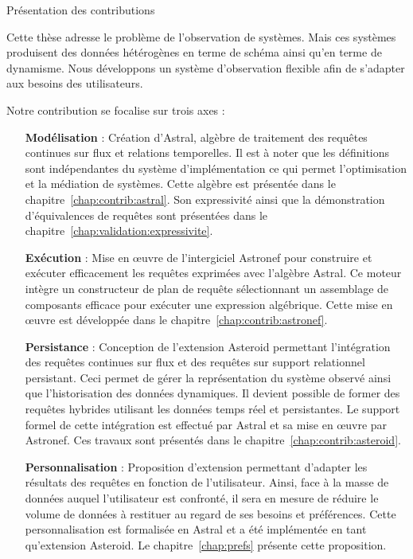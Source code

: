 \newpage
{}%
\quad

\vspace{2.3\baselineskip}
\begin{flushright} \huge Présentation des contributions \end{flushright}
\vspace{1.7\baselineskip}

Cette thèse adresse le problème de l'observation de systèmes. Mais ces systèmes produisent des données hétérogènes en terme de schéma ainsi qu'en terme de dynamisme. Nous développons un système d'observation flexible afin de s'adapter aux besoins des utilisateurs.

Notre contribution se focalise sur trois axes :
\begin{itemize}
 \item[\textbf{Modélisation}] : Création d'Astral, algèbre de traitement des requêtes continues sur flux et relations temporelles. Il est à noter que les définitions sont indépendantes du système d'implémentation ce qui permet l'optimisation et la médiation de systèmes. Cette algèbre est présentée dans le chapitre~\ref{chap:contrib:astral}. Son expressivité ainsi que la démonstration d'équivalences de requêtes sont présentées dans le chapitre~\ref{chap:validation:expressivite}.
 \item[\textbf{Exécution}] : Mise en œuvre de l'intergiciel Astronef pour construire et exécuter efficacement les requêtes exprimées avec l'algèbre Astral. Ce moteur intègre un constructeur de plan de requête sélectionnant un assemblage de composants efficace pour exécuter une expression algébrique. Cette mise en œuvre est développée dans le chapitre~\ref{chap:contrib:astronef}.
 \item[\textbf{Persistance}] : Conception de l'extension Asteroid permettant l'intégration des requêtes continues sur flux et des requêtes sur support relationnel persistant. Ceci permet de gérer la représentation du système observé ainsi que l'historisation des données dynamiques. Il devient possible de former des requêtes hybrides utilisant les données temps réel et persistantes. Le support formel de cette intégration est effectué par Astral et sa mise en œuvre par Astronef. Ces travaux sont présentés dans le chapitre~\ref{chap:contrib:asteroid}.
 \item[\textbf{Personnalisation}] : Proposition d'extension permettant d'adapter les résultats des requêtes en fonction de l'utilisateur. Ainsi, face à la masse de données auquel l'utilisateur est confronté, il sera en mesure de réduire le volume de données à restituer au regard de ses besoins et préférences. Cette personnalisation est formalisée en Astral et a été implémentée en tant qu'extension Asteroid. Le chapitre~\ref{chap:prefs} présente cette proposition.
\end{itemize}

